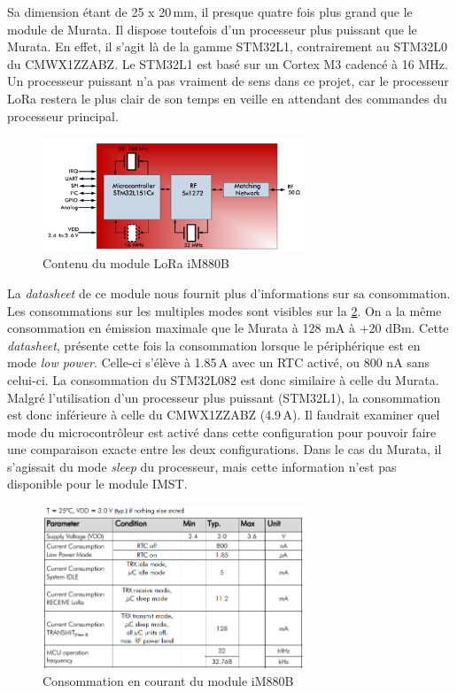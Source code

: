 Sa dimension étant de 25 x 20\,mm, il presque quatre fois plus grand que le module de Murata. Il dispose toutefois d'un processeur plus puissant que le Murata. En effet, il s'agit là de la gamme STM32L1, contrairement au STM32L0 du CMWX1ZZABZ. Le STM32L1 est basé sur un Cortex M3 cadencé à 16 MHz. Un processeur puissant n'a pas vraiment de sens dans ce projet, car le processeur LoRa restera le plus clair de son temps en veille en attendant des commandes du processeur principal.\\

\begin{figure}[ht!]
    \centering
    \includegraphics[width=0.7\textwidth]{Figures/Hardware/imst_bloc_diagram.PNG}
    \caption{Contenu du module LoRa iM880B}
    \label{fig-imst_bloc_diagram}
\end{figure}

La \textit{datasheet} de ce module nous fournit plus d'informations sur sa consommation. Les consommations sur les multiples modes sont visibles sur la \cref{fig-imst_current_consumption}. On a la même consommation en émission maximale que le Murata à 128 mA à +20 dBm. Cette \textit{datasheet}, présente cette fois la consommation lorsque le périphérique est en mode \textit{low power}. Celle-ci s'élève à 1.85\,\si{\micro}A avec un RTC activé, ou 800 nA sans celui-ci. La consommation du STM32L082 est donc similaire à celle du Murata. Malgré l'utilisation d'un processeur plus puissant (STM32L1), la consommation est donc inférieure à celle du CMWX1ZZABZ (4.9\,\si{\micro}A). Il faudrait examiner quel mode du microcontrôleur est activé dans cette configuration pour pouvoir faire une comparaison exacte entre les deux configurations. Dans le cas du Murata, il s'agissait du mode \textit{sleep} du processeur, mais cette information n'est pas disponible pour le module IMST.\\

\begin{figure}[ht!]
    \centering
    \includegraphics[width=0.7\textwidth]{Figures/Hardware/imst_current_consumption.PNG}
    \caption{Consommation en courant du module iM880B}
    \label{fig-imst_current_consumption}
\end{figure}

